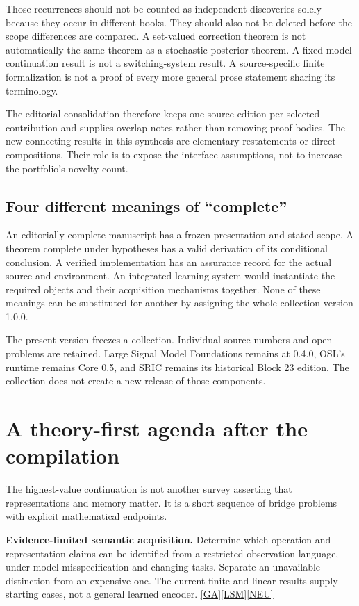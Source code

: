 \documentclass[11pt,oneside]{article}
\newcommand{\src}[1]{\hyperlink{cat:#1}{\textsf{[#1]}}}
\begin{document}
Those recurrences should not be counted as independent discoveries solely because they occur in different books. They should also not be deleted before the scope differences are compared. A set-valued correction theorem is not automatically the same theorem as a stochastic posterior theorem. A fixed-model continuation result is not a switching-system result. A source-specific finite formalization is not a proof of every more general prose statement sharing its terminology.

The editorial consolidation therefore keeps one source edition per selected contribution and supplies overlap notes rather than removing proof bodies. The new connecting results in this synthesis are elementary restatements or direct compositions. Their role is to expose the interface assumptions, not to increase the portfolio's novelty count.

\subsection{Four different meanings of ``complete''}
An editorially complete manuscript has a frozen presentation and stated scope. A theorem complete under hypotheses has a valid derivation of its conditional conclusion. A verified implementation has an assurance record for the actual source and environment. An integrated learning system would instantiate the required objects and their acquisition mechanisms together. None of these meanings can be substituted for another by assigning the whole collection version 1.0.0.

The present version freezes a collection. Individual source numbers and open problems are retained. Large Signal Model Foundations remains at 0.4.0, OSL's runtime remains Core 0.5, and SRIC remains its historical Block 23 edition. The collection does not create a new release of those components.

\section{A theory-first agenda after the compilation}
The highest-value continuation is not another survey asserting that representations and memory matter. It is a short sequence of bridge problems with explicit mathematical endpoints.

\textbf{Evidence-limited semantic acquisition.} Determine which operation and representation claims can be identified from a restricted observation language, under model misspecification and changing tasks. Separate an unavailable distinction from an expensive one. The current finite and linear results supply starting cases, not a general learned encoder. \src{GA}\src{LSM}\src{NEU}
\end{document}
